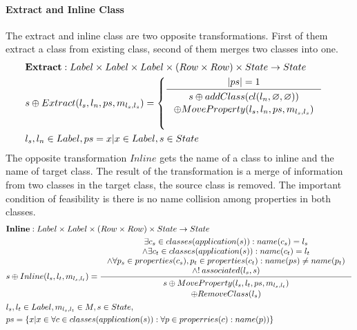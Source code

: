 \documentclass[11pt]{article}
\begin{document}
\paragraph{Extract and Inline Class}
The extract and inline class are two opposite transformations. First of them extract a class from existing class, second of them merges two classes into one.
\begin{align*}
&	\mathbf{Extract} : Label \times Label \times Label \times (Row \times Row) \times State \rightarrow State \\
&	s \oplus Extract(l_s, l_n, ps, m_{l_s, l_s}) = \begin{cases}
	\inference{|ps| = 1}{\begin{gathered}
		s \oplus addClass(cl(l_n, \varnothing, \varnothing)) \\ \oplus MoveProperty(l_s, l_n, ps, m_{l_s, l_s}) \end{gathered}}\\\\
 \end{cases}
	\\
&	l_s, l_n \in Label, ps ={ x | x  \in Label},  s \in State 
\end{align*}
The opposite transformation $Inline$ gets the name of a class to inline and the name of target class. The result of the transformation is a merge of information from two classes in the target class, the source class is removed. The important condition of feasibility is there is no name collision among properties in both classes.
\begin{align*}
&	\mathbf{Inline} : Label \times Label \times (Row \times Row) \times State \rightarrow State \\
&	s \oplus Inline(l_s, l_t, m_{l_s, l_t}) = \inference{\exists c_s \in classes(application(s)) : name(c_s) = l_s \\
\wedge \exists c_t \in classes(application(s)) : name(c_t) = l_t \\
\wedge \forall p_s \in properties(c_s), p_t \in properties(c_t) : name(ps) \neq name(p_t) \\
\wedge !\:associated(l_s, s)   }{\begin{gathered}
	s \oplus MoveProperty(l_s, l_t, ps, m_{l_s, l_t}) \\ \oplus RemoveClass(l_s) 
\end{gathered}
}\\
& l_s, l_t \in Label, m_{l_s, l_t} \in M, s \in State, \\ 
& ps = \{x | x \in \forall c \in classes(application(s)) : \forall p \in properries(c) : name(p))\}
\end{align*}
\end{document}
